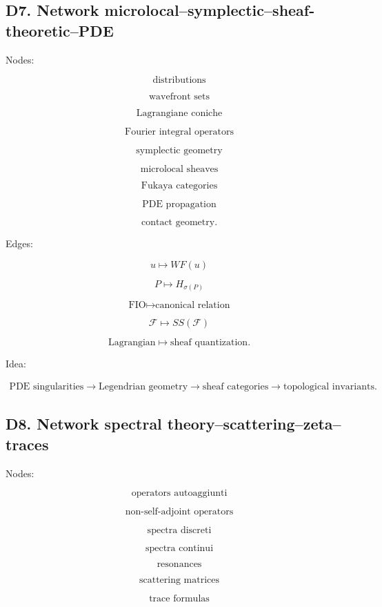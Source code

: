 \documentclass[11pt]{article}
\begin{document}
\subsection{D7. Network microlocal--symplectic--sheaf-theoretic--PDE}

Nodes:

\[
\text{distributions}
\]

\[
\text{wavefront sets}
\]

\[
\text{Lagrangiane coniche}
\]

\[
\text{Fourier integral operators}
\]

\[
\text{symplectic geometry}
\]

\[
\text{microlocal sheaves}
\]

\[
\text{Fukaya categories}
\]

\[
\text{PDE propagation}
\]

\[
\text{contact geometry}.
\]

Edges:

\[
u\mapsto WF(u)
\]

\[
P\mapsto H_{\sigma(P)}
\]

\[
\text{FIO}\mapsto \text{canonical relation}
\]

\[
\mathcal F\mapsto SS(\mathcal F)
\]

\[
\text{Lagrangian}\mapsto \text{sheaf quantization}.
\]

Idea:

\[
\begin{gathered}
\text{PDE singularities} \to \text{Legendrian geometry} \to \text{sheaf categories} \to \text{topological invariants}.
\end{gathered}
\]



\subsection{D8. Network spectral theory--scattering--zeta--traces}

Nodes:

\[
\text{operators autoaggiunti}
\]

\[
\text{non-self-adjoint operators}
\]

\[
\text{spectra discreti}
\]

\[
\text{spectra continui}
\]

\[
\text{resonances}
\]

\[
\text{scattering matrices}
\]

\[
\text{trace formulas}
\]
\end{document}
